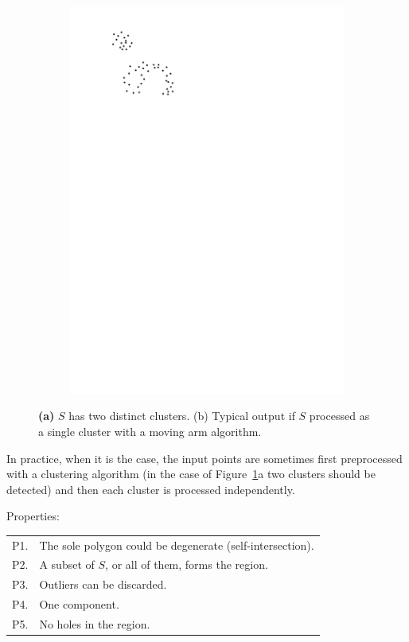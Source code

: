 \begin{figure}
\begin{subfigure}[b]{0.35\linewidth}
    \centering
    \includegraphics[page=2,width=\textwidth]{figs/clusters.pdf}
    \caption{}
  \end{subfigure}
\caption{\textbf{(a)} $S$ has two distinct clusters. {(b)} Typical output if $S$ processed as a single cluster with a moving arm algorithm.}
\label{fig:clusters}
\end{figure}
In practice, when it is the case, the input points are sometimes first preprocessed with a clustering algorithm (in the case of Figure~\ref{fig:clusters}a two clusters should be detected) and then each cluster is processed independently.

%

Properties:
\\
\begin{tabular}{@{}ll@{}}
\toprule
P1. & The sole polygon could be degenerate (self-intersection).  \\  
P2. & A subset of $S$, or all of them, forms the region. \\ 
P3. & Outliers can be discarded. \\ 
P4. & One component.  \\ 
P5. & No holes in the region.  \\  
\bottomrule
\end{tabular}



